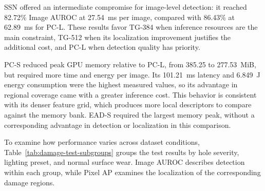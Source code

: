 SSN offered an intermediate compromise for image-level detection: it reached 82.72\% Image AUROC at 27.54~ms per image, compared with 86.43\% at 62.89~ms for PC-L. These results favor TG-384 when inference resources are the main constraint, TG-512 when its localization improvement justifies the additional cost, and PC-L when detection quality has priority.

PC-S reduced peak GPU memory relative to PC-L, from 385.25 to 277.53~MiB, but required more time and energy per image. Its 101.21~ms latency and 6.849~J energy consumption were the highest measured values, so its advantage in regional coverage came with a greater inference cost. This behavior is consistent with its denser feature grid, which produces more local descriptors to compare against the memory bank. EAD-S required the largest memory peak, without a corresponding advantage in detection or localization in this comparison.

To examine how performance varies across dataset conditions, Table~\ref{tab:damage-test-subgroups} groups the test results by hole severity, lighting preset, and normal surface wear. Image AUROC describes detection within each group, while Pixel AP examines the localization of the corresponding damage regions.


